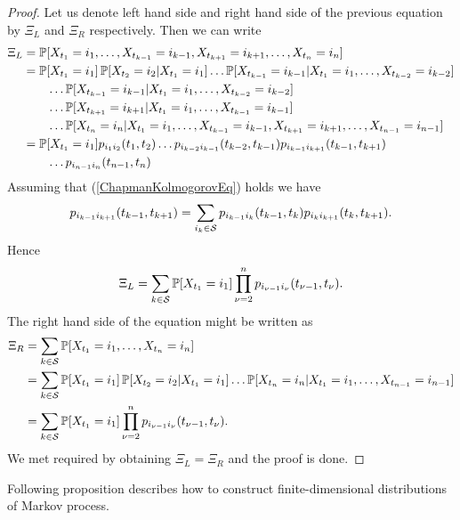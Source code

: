 {\begin{proof}
	Let us denote left hand side and right hand side of the previous equation by $\Xi_L$ and $\Xi_R$ respectively. Then we can write
	\begin{align*}
		\Xi_L &= \pr [X_{t_1} = i_1, \ldots , X_{t_{k-1}} = i_{k-1}, X_{t_{k+1}} = i_{k+1}, \ldots , X_{t_n} = i_n] \\
		&= \pr [X_{t_1} = i_1] \pr [X_{t_2} = i_2 \vert X_{t_1} = i_1] \ldots  \pr [X_{t_{k-1}} = i_{k-1} \vert X_{t_1} = i_1, \ldots , X_{t_{k-2}} = i_{k-2}] \\
		& \qquad \ldots  \pr [X_{t_{k-1}} = i_{k-1} \vert X_{t_1} = i_1, \ldots , X_{t_{k-2}} = i_{k-2}] \\
		& \qquad \ldots  \pr [X_{t_{k+1}} = i_{k+1} \vert X_{t_1} = i_1, \ldots , X_{t_{k-1}} = i_{k-1}] \\
		& \qquad \ldots  \pr [X_{t_n} = i_n \vert X_{t_1} = i_1, \ldots , X_{t_{k-1}} = i_{k-1}, X_{t_{k+1}} = i_{k+1}, \ldots , X_{t_{n-1}} = i_{n-1}] \\
		&= \pr [X_{t_1} = i_1] p_{i_1 i_2} (t_1, t_2) \ldots  p_{i_{k-2} i_{k-1}} (t_{k-2}, t_{k-1}) p_{i_{k-1} i_{k+1}} (t_{k-1}, t_{k+1}) \\
		& \qquad \ldots  p_{i_{n-1} i_n} (t_{n-1}, t_n)
	\end{align*}
	Assuming that (\ref{ChapmanKolmogorovEq}) holds we have
	\[
		p_{i_{k-1} i_{k+1}} (t_{k-1}, t_{k+1}) = \sum_{i_k \in \S} p_{i_{k-1} i_{k}} (t_{k-1}, t_{k}) p_{i_{k} i_{k+1}} (t_{k}, t_{k+1}).
	\]
	Hence
	\[
	\Xi_L = \sum_{k \in \S} \pr [X_{t_1} = i_1] \prod_{\nu = 2}^{n} p_{i_{\nu-1} i_{\nu}} (t_{\nu-1}, t_{\nu}).
	\]
	The right hand side of the equation might be written as
	\begin{align*}
		\Xi_R &= \sum_{k \in \S} \pr [X_{t_1} = i_1, \ldots , X_{t_n} = i_n] \\
		&= \sum_{k \in \S} \pr [X_{t_1} = i_1] \pr [X_{t_2} = i_2 \vert X_{t_1} = i_1] \ldots  \pr [X_{t_n} = i_n \vert X_{t_1} = i_1 , \ldots , X_{t_{n-1}} = i_{n-1}] \\
		&= \sum_{k \in \S} \pr [X_{t_1} = i_1] \prod_{\nu = 2}^{n} p_{i_{\nu-1} i_{\nu}} (t_{\nu-1}, t_{\nu}).
	\end{align*}
	We met required by obtaining $\Xi_L = \Xi_R$ and the proof is done.
\end{proof}

Following proposition describes how to construct finite-dimensional distributions of Markov process.

}
